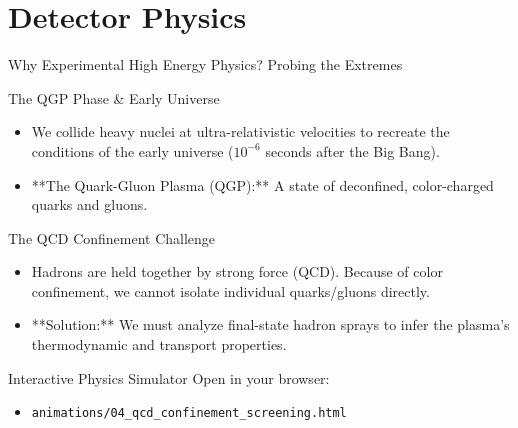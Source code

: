 \documentclass[aspectratio=169]{beamer}
\begin{document}
\section{Detector Physics}

\begin{frame}{Why Experimental High Energy Physics? Probing the Extremes}
    \begin{block}{The QGP Phase \& Early Universe}
        \begin{itemize}
            \item We collide heavy nuclei at ultra-relativistic velocities to recreate the conditions of the early universe ($10^{-6}$ seconds after the Big Bang).
            \item **The Quark-Gluon Plasma (QGP):** A state of deconfined, color-charged quarks and gluons.
        \end{itemize}
    \end{block}
    \begin{block}{The QCD Confinement Challenge}
        \begin{itemize}
            \item Hadrons are held together by strong force (QCD). Because of color confinement, we cannot isolate individual quarks/gluons directly.
            \item **Solution:** We must analyze final-state hadron sprays to infer the plasma's thermodynamic and transport properties.
        \end{itemize}
    \end{block}
    \begin{alertblock}{Interactive Physics Simulator}
        Open in your browser:
        \begin{itemize}
            \item \texttt{animations/04\_qcd\_confinement\_screening.html} 
        \end{itemize}
    \end{alertblock}
\end{frame}
\end{document}
